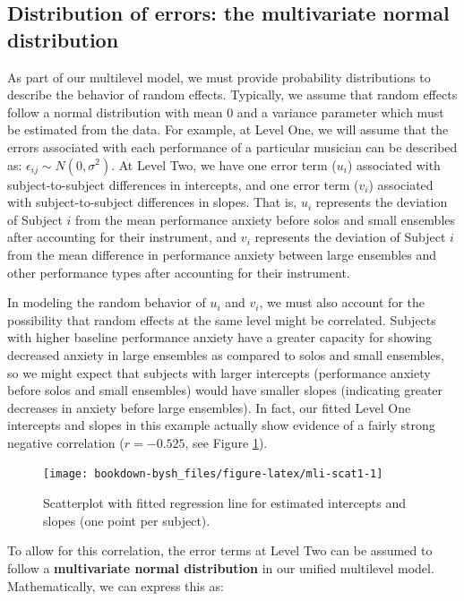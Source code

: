 \documentclass[
]{krantz}
\begin{document}
\hypertarget{MVN}{%
\subsection{Distribution of errors: the multivariate normal distribution}\label{MVN}}

As part of our multilevel model, we must provide probability distributions to describe the behavior of random effects. Typically, we assume that random effects follow a normal distribution with mean 0 and a variance parameter which must be estimated from the data. For example, at Level One, we will assume that the errors associated with each performance of a particular musician can be described as: \(\epsilon_{ij}\sim N(0,\sigma^2)\). At Level Two, we have one error term (\(u_{i}\)) associated with subject-to-subject differences in intercepts, and one error term (\(v_{i}\)) associated with subject-to-subject differences in slopes. That is, \(u_{i}\) represents the deviation of Subject \(i\) from the mean performance anxiety before solos and small ensembles after accounting for their instrument, and \(v_{i}\) represents the deviation of Subject \(i\) from the mean difference in performance anxiety between large ensembles and other performance types after accounting for their instrument.

In modeling the random behavior of \(u_{i}\) and \(v_{i}\), we must also account for the possibility that random effects at the same level might be correlated. Subjects with higher baseline performance anxiety have a greater capacity for showing decreased anxiety in large ensembles as compared to solos and small ensembles, so we might expect that subjects with larger intercepts (performance anxiety before solos and small ensembles) would have smaller slopes (indicating greater decreases in anxiety before large ensembles). In fact, our fitted Level One intercepts and slopes in this example actually show evidence of a fairly strong negative correlation (\(r=-0.525\), see Figure \ref{fig:mli-scat1}).

\begin{figure}

{\centering \texttt{[image: bookdown-bysh\_files/figure-latex/mli-scat1-1]} 

}

\caption{Scatterplot with fitted regression line for estimated intercepts and slopes (one point per subject).}\label{fig:mli-scat1}
\end{figure}

To allow for this correlation, the error terms at Level Two can be assumed to follow a \textbf{multivariate normal distribution}  in our unified multilevel model. Mathematically, we can express this as:
\end{document}
